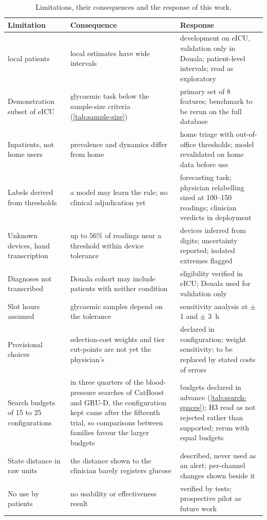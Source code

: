 \begin{table}[htbp]
\centering\footnotesize
\caption{Limitations, their consequences and the response of this work.}\label{tab:limitations}
\begin{tabularx}{\textwidth}{@{}>{\raggedright\arraybackslash}p{3.4cm} >{\raggedright\arraybackslash}X >{\raggedright\arraybackslash}X@{}}
\toprule
\textbf{Limitation} & \textbf{Consequence} & \textbf{Response} \\
\midrule
32 local patients & local estimates have wide intervals & development on eICU, validation only in Douala; patient-level intervals; read as exploratory \\
Demonstration subset of eICU & glycaemic task below the sample-size criteria (\cref{tab:sample-size}) & primary set of 8 features; benchmark to be rerun on the full database \\
Inpatients, not home users & prevalence and dynamics differ from home & home triage with out-of-office thresholds; model revalidated on home data before use \\
Labels derived from thresholds & a model may learn the rule; no clinical adjudication yet & forecasting task; physician relabelling sized at 100--150 readings; clinician verdicts in deployment \\
Unknown devices, hand transcription & up to 56\% of readings near a threshold within device tolerance & devices inferred from digits; uncertainty reported; isolated extremes flagged \\
Diagnoses not transcribed & Douala cohort may include patients with neither condition & eligibility verified in eICU; Douala used for validation only \\
Slot hours assumed & glycaemic samples depend on the tolerance & sensitivity analysis at $\pm$ 1 and $\pm$ 3~h \\
Provisional choices & selection-cost weights and tier cut-points are not yet the physician's & declared in configuration; weight sensitivity; to be replaced by stated costs of errors \\
Search budgets of 15 to 25 configurations & in three quarters of the blood-pressure searches of CatBoost and GRU-D, the configuration kept came after the fifteenth trial, so comparisons between families favour the larger budgets & budgets declared in advance (\cref{tab:search-spaces}); H3 read as not rejected rather than supported; rerun with equal budgets \\
State distance in raw units & the distance shown to the clinician barely registers glucose & described, never used as an alert; per-channel changes shown beside it \\
No use by patients & no usability or effectiveness result & verified by tests; prospective pilot as future work \\
\bottomrule
\end{tabularx}
\end{table}

